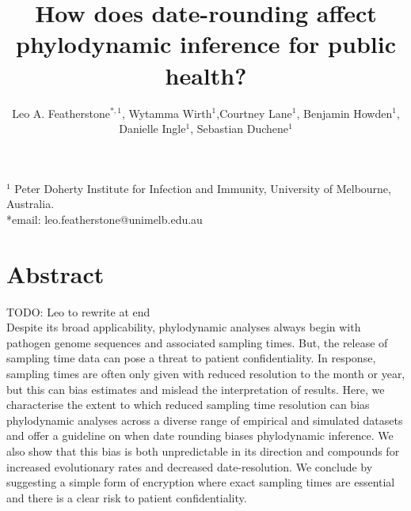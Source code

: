 \documentclass[11pt]{article}
\title{How does date-rounding affect phylodynamic inference for public health?}
\author{Leo A. Featherstone$^{\ast,1}$, Wytamma Wirth$^{1}$,Courtney Lane$^{1}$, Benjamin Howden$^{1}$,\\Danielle Ingle$^{1}$, Sebastian Duchene$^{1}$}
\begin{document}
\maketitle

$^{1}$ Peter Doherty Institute for Infection and Immunity, University of Melbourne, Australia.\\
*email: leo.featherstone@unimelb.edu.au

\section*{Abstract}
 TODO: Leo to rewrite at end \\
 Despite its broad applicability, phylodynamic analyses always begin with pathogen genome sequences and associated sampling times. But, the release of sampling time data can pose a threat to patient confidentiality. In response, sampling times are often only given with reduced resolution to the month or year, but this can bias estimates and mislead the interpretation of results. Here, we characterise the extent to which reduced sampling time resolution can bias phylodynamic analyses across a diverse range of empirical and simulated datasets and offer a guideline on when date rounding biases phylodynamic inference. We also show that this bias is both unpredictable in its direction and compounds for increased evolutionary rates and decreased date-resolution. We conclude by suggesting a simple form of encryption where exact sampling times are essential and there is a clear risk to patient confidentiality.
\end{document}
